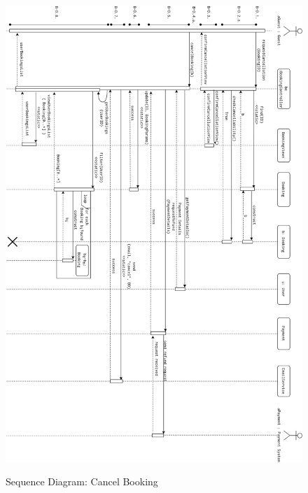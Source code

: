 \begin{figure}[H]
    \centering
    \includegraphics[width=16cm]{img/seq_diagrams/sqd_b_d.png} \\[0.5em]
    \caption{Sequence Diagram: Cancel Booking}
    \label{Sequence Diagram: Cancel Booking}
\end{figure}


